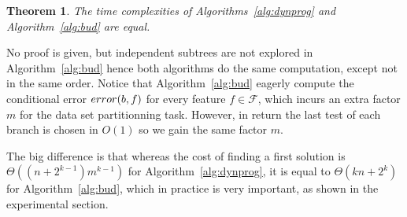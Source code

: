 \documentclass{article}
\newtheorem{theorem}{Theorem}
\newcommand{\features}{\ensuremath{{\mathcal F}}\xspace}
\newcommand{\afeat}[0]{\ensuremath{f}}
\newcommand{\error}[1][]{\ensuremath{\ifthenelse{\equal{#1}{}}{{error}}{{error({{#1}})}}}}
\newcommand{\abranch}[0]{\ensuremath{b}}
\begin{document}
		\begin{theorem}
			The time complexities of Algorithms~\ref{alg:dynprog} and Algorithm~\ref{alg:bud} are equal.
			\end{theorem}
			
			No proof is given, but independent subtrees are not explored in Algorithm~\ref{alg:bud} hence both algorithms do the same computation, except not in the same order. Notice that Algorithm~\ref{alg:bud} eagerly compute the conditional error $\error[\abranch,\afeat]$ for every feature $\afeat \in \features$, which incurs an extra factor $m$ for the data set partitionning task. However, in return the last test of each branch is chosen in $O(1)$ so we gain the same factor $m$.
			
			The big difference is that whereas the cost of finding a first solution is $\Theta((n + 2^{k-1})m^{k-1})$ for Algorithm~\ref{alg:dynprog}, it is equal to $\Theta(kn + 2^k)$ for Algorithm~\ref{alg:bud}, which in practice is very important, as shown in the experimental section.
		
		
		


\end{document}
